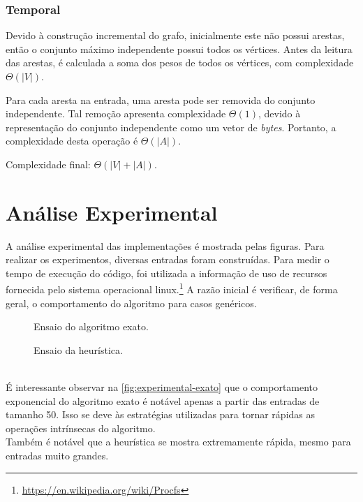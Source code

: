 \documentclass{article}
\begin{document}
\subsubsection{Temporal}
Devido à construção incremental do grafo, inicialmente este não possui arestas, então o conjunto máximo independente possui todos os vértices. Antes da leitura das arestas, é calculada a soma dos pesos de todos os vértices, com complexidade $\Theta(|V|)$.

Para cada aresta na entrada, uma aresta pode ser removida do conjunto independente. Tal remoção apresenta complexidade $\Theta(1)$, devido à representação do conjunto independente como um vetor de \textit{bytes}. Portanto, a complexidade desta operação é $\Theta(|A|)$.

Complexidade final: $\Theta(|V| + |A|)$.


\pagebreak


\section{Análise Experimental}
A análise experimental das implementações é mostrada pelas figuras. Para realizar os experimentos, diversas entradas foram construídas. Para medir o tempo de execução do código, foi utilizada a informação de uso de recursos fornecida pelo sistema operacional linux.\footnote{\url{https://en.wikipedia.org/wiki/Procfs}} A razão inicial é verificar, de forma geral, o comportamento do algoritmo para casos genéricos.
\begin{figure}[h]
  \centering
  
  
  \caption{Ensaio do algoritmo exato.}
  \label{fig:experimental-exato}
\end{figure}
\vspace{-10pt}
\begin{figure}[h]
  \centering
  
  
  \caption{Ensaio da heurística.}
\end{figure} \\
É interessante observar na \autoref{fig:experimental-exato} que o comportamento exponencial do algoritmo exato é notável apenas a partir das entradas de tamanho 50. Isso se deve às estratégias utilizadas para tornar rápidas as operações intrínsecas do algoritmo.
\\[5pt]
Também é notável que a heurística se mostra extremamente rápida, mesmo para entradas muito grandes.
\end{document}
